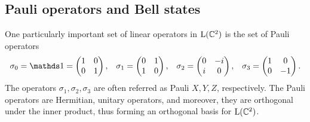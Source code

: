 \subsection{Pauli operators and Bell states}
One particularly important set of linear operators in $\mathrm{L}(\mathbb{C}^{2})$ is 
the set of Pauli operators
\begin{equation} 
\label{eq:Pauli-operators}
  \begin{array}{llll}
    \sigma_{0} = \I = \begin{pmatrix} 1 & 0  \\ 0 & 1  \end{pmatrix}, & 
    \sigma_{1} = \begin{pmatrix} 0 & 1  \\ 1 & 0  \end{pmatrix}, & 
    \sigma_{2} = \begin{pmatrix} 0 & -i \\ i & 0  \end{pmatrix}, & 
    \sigma_{3} = \begin{pmatrix} 1 & 0  \\ 0 & -1 \end{pmatrix}.
  \end{array}
\end{equation}
The operators $\sigma_{1},\sigma_{2},\sigma_{3}$ are often referred as Pauli $X, Y, Z$, respectively. 
The Pauli operators are Hermitian, unitary operators, and moreover,
they are orthogonal under the inner product, thus forming an orthogonal basis for
$\mathrm{L}(\mathbb{C}^{2})$.

